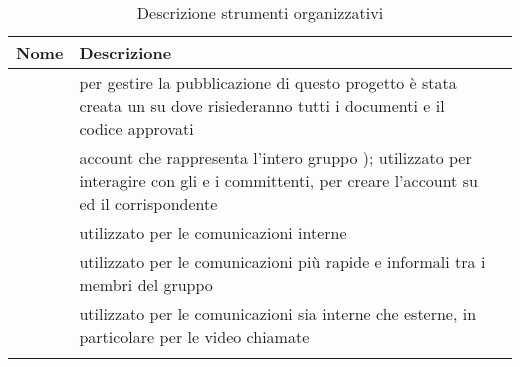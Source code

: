 \setlength{\freewidth}{\dimexpr\textwidth-0\tabcolsep}
	\renewcommand{\arraystretch}{1.5}
	\setlength{\aboverulesep}{0pt}
	\setlength{\belowrulesep}{0pt}
	\begin{longtable}{L{.210\freewidth} L{.6\freewidth} L{.080\freewidth}}
		\toprule 
		\textbf{Nome} & \textbf{Descrizione} \\
		\toprule
		\endhead		
		\textbf{} & per gestire la pubblicazione di questo progetto è stata creata un  su  dove risiederanno tutti i documenti e il codice approvati \\
		\textbf{} & account che rappresenta l’intero gruppo \Mail{}); utilizzato per interagire con gli  e i committenti, per creare l’account su  ed il corrispondente  \\
		 \textbf{} & utilizzato per le comunicazioni interne \\
		\textbf{} & utilizzato per le comunicazioni più rapide e informali tra i membri del
gruppo \\
		 \textbf{} & utilizzato per le comunicazioni sia interne che esterne, in particolare per le video chiamate\\
		\bottomrule
		\hiderowcolors
		\caption{Descrizione strumenti organizzativi}
	\end{longtable}

